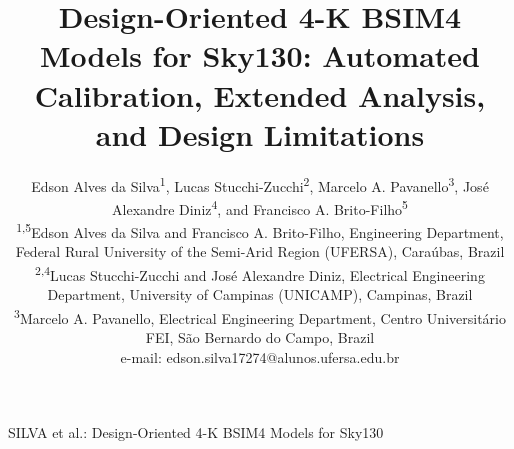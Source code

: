 \documentclass[a4paper,10pt,twoside,twocolumn,final]{JICS_LaTexGuidelines} %
\begin{document}
\title{Design-Oriented 4-K BSIM4 Models for Sky130: Automated Calibration, Extended Analysis, and Design Limitations}
\author{Edson Alves da Silva\textsuperscript1, Lucas Stucchi-Zucchi\textsuperscript2, Marcelo A. Pavanello\textsuperscript3, Jos\'e Alexandre Diniz\textsuperscript4, and Francisco A. Brito-Filho\textsuperscript5\\\vspace{1.2em}\small%
\textsuperscript{1,5}Edson Alves da Silva and Francisco A. Brito-Filho, Engineering Department, Federal Rural University of the Semi-Arid Region (UFERSA), Cara\'ubas, Brazil\\%
\textsuperscript{2,4}Lucas Stucchi-Zucchi and Jos\'e Alexandre Diniz, Electrical Engineering Department, University of Campinas (UNICAMP), Campinas, Brazil\\%
\textsuperscript3Marcelo A. Pavanello, Electrical Engineering Department, Centro Universit\'ario FEI, S\~ao Bernardo do Campo, Brazil\\%
e-mail: edson.silva17274@alunos.ufersa.edu.br
}
%
%
{SILVA et al.: Design-Oriented 4-K BSIM4 Models for Sky130}%
\renewcommand*\footnoterule{}%
%
\maketitle
\end{document}
